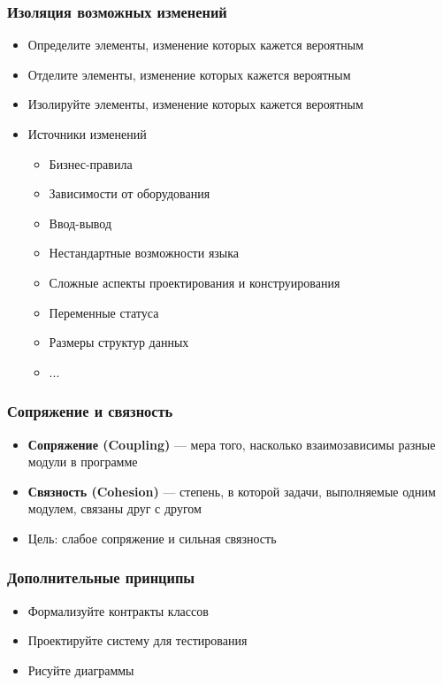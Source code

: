 \documentclass[xetex,mathserif,serif]{beamer}
\begin{document}
	\begin{frame}
		\frametitle{Изоляция возможных изменений}
		\begin{itemize}
			\item Определите элементы, изменение которых кажется вероятным
			\item Отделите элементы, изменение которых кажется вероятным
			\item Изолируйте элементы, изменение которых кажется вероятным
			\item Источники изменений
			\begin{itemize}
				\item Бизнес-правила
				\item Зависимости от оборудования
				\item Ввод-вывод
				\item Нестандартные возможности языка
				\item Сложные аспекты проектирования и конструирования
				\item Переменные статуса
				\item Размеры структур данных
				\item ...
			\end{itemize}
		\end{itemize}
	\end{frame}

	\begin{frame}
		\frametitle{Сопряжение и связность}
		\begin{itemize}
			\item \textbf{Сопряжение (Coupling)} --- мера того, насколько взаимозависимы разные модули в программе
			\item \textbf{Связность (Cohesion)} --- степень, в которой задачи, выполняемые одним модулем, связаны друг с другом
			\item Цель: слабое сопряжение и сильная связность
		\end{itemize}
	\end{frame}

	\begin{frame}
		\frametitle{Дополнительные принципы}
		\begin{itemize}
			\item Формализуйте контракты классов
			\item Проектируйте систему для тестирования
			\item Рисуйте диаграммы
		\end{itemize}
	\end{frame}
\end{document}
